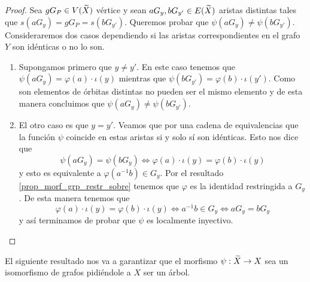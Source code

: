 \documentclass[tesis.tex]{subfiles}
\begin{document}
\begin{proof}
	Sea $gG_{P} \in V(\widetilde X)$ vértice y sean $aG_{y},bG_{y' }\in E(\widetilde X)$ aristas distintas tales que $s(aG_{y}) = gG_{P} = s(bG_{y'})$.
	Queremos probar que $\psi(aG_{y}) \neq \psi(bG_{y'})$.
	Consideraremos dos casos dependiendo si las aristas correspondientes en el grafo $Y$ son idénticas o no lo son.
	
	\begin{enumerate}
		\item Supongamos primero que $y \neq y'$.
		En este caso tenemos que $\psi(aG_{y}) = \varphi(a) \cdot \iota (y)$ mientras que $\psi(bG_{y'}) = \varphi(b) \cdot \iota (y')$.
		Como son elementos de órbitas distintas no pueden ser el mismo elemento y de esta manera concluimos que $\psi(aG_{y}) \neq \psi(bG_{y'}).$
		
		\item El otro caso es que $y=y'$. 
		Veamos que por una cadena de equivalencias que la función $\psi$ coincide en estas aristas si y solo sí son idénticas.
		Esto nos dice que
		\[
		\psi(aG_{y}) = \psi(bG_{y}) \iff \varphi(a) \cdot  \iota(y) = \varphi(b)\cdot \iota(y)
		\]
		y esto es equivalente a $\varphi(a^{-1}b) \in G_{y}$.
		Por el resultado \ref{prop_morf_grp_restr_sobre} tenemos que $\varphi$ es la identidad restringida a $G_{y}$.
		De esta manera tenemos que
		\[
			\varphi(a) \cdot  \iota(y) = \varphi(b)\cdot \iota(y) \iff  a^{-1}b \in G_{y} \iff aG_{y} = bG_{y}
		\]
		y así terminamos de probar que $\psi$ es localmente inyectivo.
		
	\end{enumerate}
\end{proof}	
	


El siguiente resultado nos va a garantizar que el morfismo $\psi: \widetilde X \to X$ sea un isomorfismo de grafos pidiéndole a $X$ ser un árbol.
\end{document}
